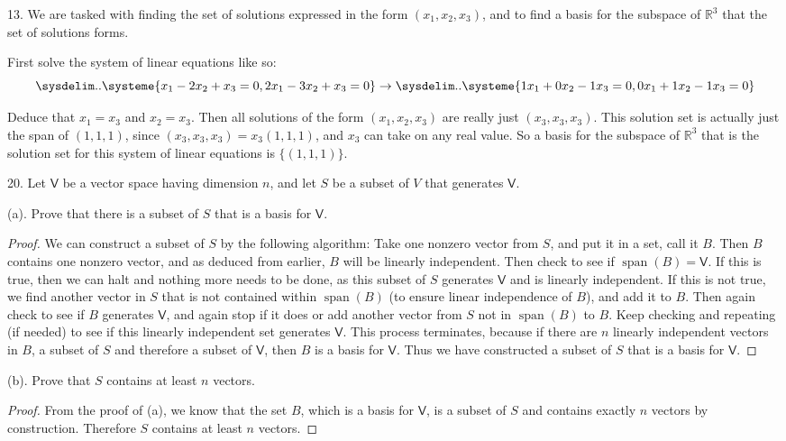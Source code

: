 \documentclass[11pt]{article}
\newcommand{\br}[1]{\left(#1\right)}
\newcommand{\cbr}[1]{\{#1\}}
\DeclareMathOperator{\Span}{span}
\begin{document}
13. We are tasked with finding the set of solutions expressed in the form $\br{x_1,x_2,x_3}$, and to find a basis for the subspace of $\mathbb{R}^3$ that the set of solutions forms.

First solve the system of linear equations like so:
\begin{equation*}
    \sysdelim..\systeme{
    x_1-2x_2+x_3 = 0,
    2x_1-3x_2+x_3 = 0
    }\to
    \sysdelim..\systeme{
    1x_1+0x_2-1x_3 = 0,
    0x_1+1x_2-1x_3 = 0
    }
\end{equation*}

Deduce that $x_1=x_3$ and $x_2=x_3$. Then all solutions of the form $(x_1,x_2,x_3)$ are really just $(x_3,x_3,x_3)$. This solution set is actually just the span of $\br{1,1,1}$, since $(x_3,x_3,x_3) = x_3\br{1,1,1}$, and $x_3$ can take on any real value. So a basis for the subspace of $\mathbb{R}^3$ that is the solution set for this system of linear equations is $\cbr{\br{1,1,1}}$.

20. Let $\mathsf{V}$ be a vector space having dimension $n$, and let $S$ be a subset of $V$ that generates $\mathsf{V}$.

(a). Prove that there is a subset of $S$ that is a basis for $\mathsf{V}$.
\begin{proof}
    We can construct a subset of $S$ by the following algorithm: Take one nonzero vector from $S$, and put it in a set, call it $B$. Then $B$ contains one nonzero vector, and as deduced from earlier, $B$ will be linearly independent. Then check to see if $\Span\br{B} = \mathsf{V}$. If this is true, then we can halt and nothing more needs to be done, as this subset of $S$ generates $\mathsf{V}$ and is linearly independent. If this is not true, we find another vector in $S$ that is not contained within $\Span\br{B}$ (to ensure linear independence of $B$), and add it to $B$. Then again check to see if $B$ generates $\mathsf{V}$, and again stop if it does or add another vector from $S$ not in $\Span\br{B}$ to $B$. Keep checking and repeating (if needed) to see if this linearly independent set generates $\mathsf{V}$. This process terminates, because if there are $n$ linearly independent vectors in $B$, a subset of $S$ and therefore a subset of $\mathsf{V}$, then $B$ is a basis for $\mathsf{V}$. Thus we have constructed a subset of $S$ that is a basis for $\mathsf{V}$.
\end{proof}

(b). Prove that $S$ contains at least $n$ vectors.
\begin{proof}
    From the proof of (a), we know that the set $B$, which is a basis for $\mathsf{V}$, is a subset of $S$ and contains exactly $n$ vectors by construction. Therefore $S$ contains at least $n$ vectors.
\end{proof}
\end{document}
